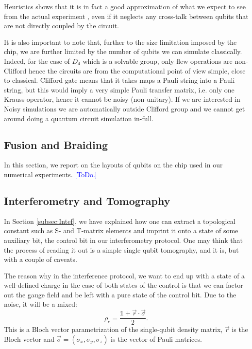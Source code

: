 \documentclass[two column]{article}
\newcommand{\jovan}[1]{\textcolor{blue}{[#1]}}
\begin{document}
Heuristics shows that it is in fact a good approximation of what we expect to see from the actual experiment \cite{}, even if it neglects any cross-talk between qubits that are not directly coupled by the circuit.

It is also important to note that, further to the size limitation imposed by the chip, we are further limited by the number of qubits we can simulate classically.
Indeed, for the case of $D_4$ which is a solvable group, only flew operations are non-Clifford hence the circuits are from the computational point of view simple, close to classical. 
Clifford gate means that it takes maps a Pauli string into a Pauli string, but this would imply a very simple Pauli transfer matrix, i.e. only one Krauss operator, hence it cannot be noisy (non-unitary).
If we are interested in Noisy simulations we are automatically outside Clifford group and we cannot get around doing a quantum circuit simulation in-full.


\subsection{Fusion and Braiding}

In this section, we report on the layouts of qubits on the chip used in our numerical experiments.
\jovan{ToDo.}

\subsection{Interferometry and Tomography}

In Section \ref{subsec:Intef}, we have explained how one can extract a topological constant such as S- and T-matrix elements and imprint it onto a state of some auxiliary bit, the control bit in our interferometry protocol.
One may think that the process of reading it out is a simple single qubit tomography, and it is, but with a couple of caveats.

The reason why in the interference protocol, we want to end up with a state of a well-defined charge in the case of both states of the control is that we can factor out the gauge field and be left with a pure state of the control bit.
Due to the noise, it will be a mixed:
\begin{equation}
    \rho_c = \frac{\mathbb{1} + \vec{r} \cdot \vec{\sigma}}{2}.
\end{equation}
This is a Bloch vector parametrization of the single-qubit density matrix, $\vec{r}$ is the Bloch vector and $\vec{\sigma} = (\sigma_x, \sigma_y, \sigma_z)$ is the vector of Pauli matrices.
\end{document}
